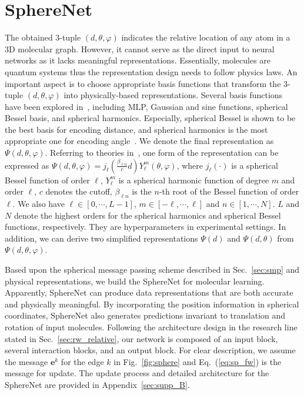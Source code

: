 \documentclass{article}
\begin{document}
\section{SphereNet} \label{sec:spherenet}
The obtained 3-tuple $(d, \theta, \varphi)$ indicates the relative location of 
any atom in a 3D molecular graph. However, 
it cannot serve as the direct input to neural networks as
it lacks meaningful representations.
Essentially, molecules are quantum systems thus the representation design needs to
follow physics laws.
An important aspect is to choose appropriate basis functions that 
transform the 3-tuple $(d, \theta, \varphi)$ into physically-based representations.
Several basis functions have been explored in~\citet{hu2021forcenet,klicpera_dimenet_2020}, including
MLP, Gaussian and sine functions, spherical Bessel basis, and spherical harmonics.
Especially, spherical Bessel is shown to be the best basis for encoding distance, and
spherical harmonics is the most appropriate
one for encoding angle~\citep{hu2021forcenet,klicpera_dimenet_2020}.
We denote the final representation as $\Psi(d, \theta, \varphi)$.
Referring to theories in~\citet{griffiths2018introduction,cohen2019gauge,klicpera_dimenet_2020},
one form of the representation
can be expressed as $\Psi(d, \theta, \varphi) = j_{\ell}\left(\frac{\beta_{\ell n}}{c}d\right)Y_{\ell}^{m}(\theta, \varphi)$,
where $j_{\ell}(\cdot)$ is a spherical Bessel function of order $\ell$,
$Y_{\ell}^{m}$ is a spherical harmonic function of degree $m$ and order $\ell$,
$c$ denotes the cutoff,
$\beta_{\ell n}$ is the $n$-th root of the
Bessel function of order $\ell$.
We also have
$\ell \in [0,\cdots,L-1]$, $m \in [-\ell,\cdots,\ell]$ and $n \in [1,\cdots,N]$.
$L$ and $N$ denote
the highest orders for the spherical harmonics and spherical Bessel functions,
respectively.
They are hyperparameters in experimental settings.
In addition, we can derive two simplified representations $\Psi(d)$ and $\Psi(d, \theta)$
from $\Psi(d, \theta, \varphi)$.


Based upon the spherical message passing scheme described in Sec.~\ref{sec:smp} and physical representations, we build the SphereNet
for molecular learning.
Apparently, SphereNet can produce data representations
that are both accurate and physically meaningful.
By incorporating the position information in
spherical coordinates,
SphereNet also generates predictions invariant to 
translation and rotation of input molecules.
\textcolor{COLOR}{Following the architecture design in the research line
stated in Sec.~\ref{sec:rw_relative},}
our network is composed of an input block,
several interaction blocks, and an output block.
For clear description, we assume the message 
$\mathbf{e}^k$ for the edge $k$ in Fig.~\ref{fig:sphere} and Eq.~(\ref{eq:sp_fw}) is the message for update.
The update process and detailed architecture for the SphereNet are 
provided
in Appendix~\ref{sec:supp_B}.
\end{document}

